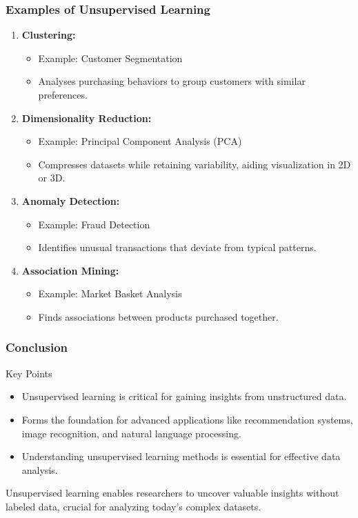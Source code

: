 \documentclass{beamer}
\begin{document}
\begin{frame}[fragile]
    \frametitle{Examples of Unsupervised Learning}
    \begin{enumerate}
        \item \textbf{Clustering:}
            \begin{itemize}
                \item Example: Customer Segmentation
                \item Analyses purchasing behaviors to group customers with similar preferences.
            \end{itemize}
        
        \item \textbf{Dimensionality Reduction:}
            \begin{itemize}
                \item Example: Principal Component Analysis (PCA)
                \item Compresses datasets while retaining variability, aiding visualization in 2D or 3D.
            \end{itemize}
        
        \item \textbf{Anomaly Detection:}
            \begin{itemize}
                \item Example: Fraud Detection
                \item Identifies unusual transactions that deviate from typical patterns.
            \end{itemize}
        
        \item \textbf{Association Mining:}
            \begin{itemize}
                \item Example: Market Basket Analysis
                \item Finds associations between products purchased together.
            \end{itemize}
    \end{enumerate}
\end{frame}

\begin{frame}[fragile]
    \frametitle{Conclusion}
    \begin{block}{Key Points}
        \begin{itemize}
            \item Unsupervised learning is critical for gaining insights from unstructured data.
            \item Forms the foundation for advanced applications like recommendation systems, image recognition, and natural language processing.
            \item Understanding unsupervised learning methods is essential for effective data analysis.
        \end{itemize}
    \end{block}
    Unsupervised learning enables researchers to uncover valuable insights without labeled data, crucial for analyzing today's complex datasets.
\end{frame}
\end{document}
